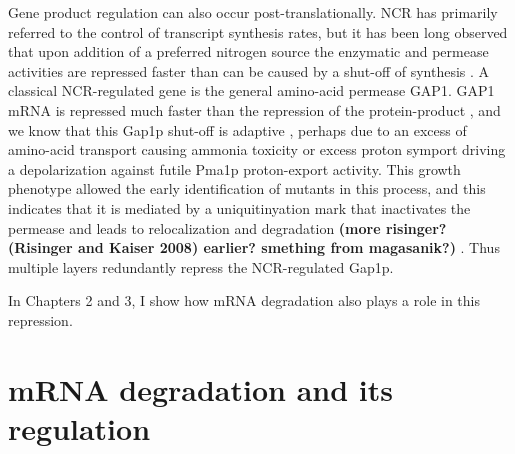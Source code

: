 Gene product
regulation can also occur post-translationally. NCR has primarily
referred to the control of transcript synthesis rates, but it has been
long observed that upon addition of a preferred nitrogen source the
enzymatic and permease activities are repressed faster than can be
caused by a shut-off of synthesis 
\parencite{cooper1983function}. A
classical NCR-regulated gene is the general amino-acid permease GAP1.
GAP1 mRNA is repressed much faster than the repression of the
protein-product 
\parencite{stanbrough1995transcriptional}
, and we know that this
Gap1p shut-off is adaptive \parencite{risinger2006activity}, 
perhaps due to an
excess of amino-acid transport causing ammonia toxicity 
\parencite{hess2006ammonium}
or excess proton symport driving a depolarization against futile
Pma1p proton-export activity. This growth phenotype allowed the early
identification of mutants in this process, and this indicates that it
is mediated by a uniquitinyation mark that inactivates the permease
and leads to relocalization and degradation 
\textbf{(more risinger? (Risinger and Kaiser 2008) earlier? smething
from magasanik?)}
. Thus multiple layers redundantly repress
the NCR-regulated Gap1p.  

In Chapters 2 and 3, I show how mRNA
degradation also plays a role in this repression.  

\section{mRNA degradation and its regulation}

